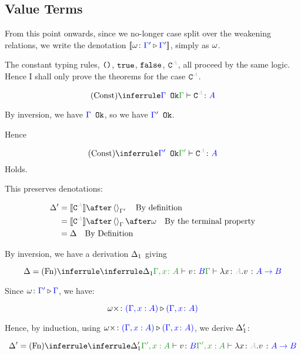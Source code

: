 \documentclass{report}
\begin{document}
\subsection{Value Terms}
From this point onwards, since we no-longer case split over the weakening relations, we write the denotation ${\bf [\![}\omega \colon {\color{blue}\Gamma'} \triangleright {\color {blue} \Gamma'}{\bf ]\!]}$, simply as $\omega$.


The constant typing rules, $\texttt{()}$, $\texttt{true}$, $\texttt{false}$, $\const{A}$, all proceed by the same logic. Hence I shall only prove the theorems for the case $\const{A}$.

\begin{equation}
    \truleconst
\end{equation}

By inversion, we have ${\color{blue} \Gamma} \texttt{ Ok}$, so we have ${\color{blue} \Gamma'} \texttt{ Ok}$.

Hence

\begin{equation}
    \ntreeruleI{Const}{\ok{\G'}}{\typerelation{\G'}{\const{A}}{A}}
\end{equation}
Holds.

This preserves denotations:


\begin{align}
    \D' & = \deno{\const{A}} \after \term{\G'}\qt{By definition}\\
    & = \deno{\const{A}} \after \term{\G}\after \w \qt{By the terminal property}\\
    & = \D\qt{By Definition}\\
\end{align}


By inversion, we have a derivation $\Delta_1$ giving

\begin{equation}
    \D = \ntreeruleI{Fn}{
        \treeruleI{\D_1}{\typerelation{\gax}{v}{B}}
    }{\gtyperelation{\lam{x}{A}{v}}{\ab}}
\end{equation}

Since $\omega \colon {\color{blue}\Gamma'} \triangleright {\color {blue} \Gamma}$, we have:

\begin{equation}
    \omega\times \colon {\color{blue}(\Gamma,x:  A)} \triangleright {\color {blue} (\Gamma, x\colon A)}
\end{equation}

Hence, by induction, using $\omega\times \colon {\color{blue}(\Gamma,x:  A)} \triangleright {\color {blue} (\Gamma, x\colon A)}$, we derive $\Delta_1'$:

\begin{equation}
    \D' = \ntreeruleI{Fn}{
        \treeruleI{\D_1'}{\typerelation{\G',x: A}{v}{B}}
    }{\typerelation{\G',x: A}{\lam{x}{A}{v}}{\ab}}
\end{equation}
\end{document}
